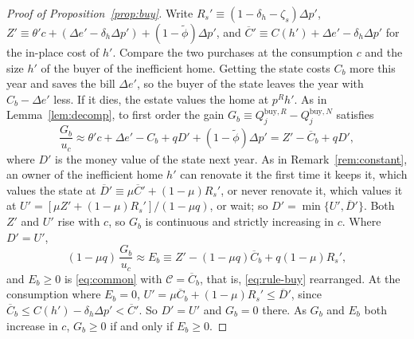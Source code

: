 \begin{proof}[Proof of Proposition~\ref{prop:buy}]
Write $R_s'\equiv(1-\delta_h-\zeta_s)\Delta p'$,
$Z'\equiv\theta'c+(\Delta e'-\delta_h\Delta p')+(1-\tilde\phi)\Delta p'$,
and $\overline C'\equiv C(h')+\Delta e'-\delta_h\Delta p'$ for the in-place
cost of $h'$. Compare the two purchases at the consumption $c$ and the size
$h'$ of the buyer of the inefficient home. Getting the state costs $C_b$
more this year and saves the bill $\Delta e'$, so the buyer of the state
leaves the year with $C_b-\Delta e'$ less. If it dies, the estate values
the home at $p^Rh'$. As in Lemma~\ref{lem:decomp}, to first order the gain
$G_b\equiv Q_j^{\mathrm{buy},R}-Q_j^{\mathrm{buy},N}$ satisfies
\begin{equation*}
  \frac{G_b}{u_c}\approx\theta'c+\Delta e'-C_b+qD'+(1-\tilde\phi)\Delta p'
  =Z'-\overline C_b+qD',
\end{equation*}
where $D'$ is the money value of the state next year. As in
Remark~\ref{rem:constant}, an owner of the inefficient home $h'$ can
renovate it the first time it keeps it, which values the state at
$\overline D'\equiv\mu\overline C'+(1-\mu)R_s'$, or never renovate it, which
values it at $U'=[\mu Z'+(1-\mu)R_s']/(1-\mu q)$, or wait; so
$D'=\min\{U',\overline D'\}$. Both $Z'$ and $U'$ rise with $c$, so $G_b$ is
continuous and strictly increasing in $c$. Where $D'=U'$,
\begin{equation*}
  (1-\mu q)\,\frac{G_b}{u_c}\approx
  E_b\equiv Z'-(1-\mu q)\overline C_b+q(1-\mu)R_s',
\end{equation*}
and $E_b\ge0$ is \eqref{eq:common} with $\mathcal C=\overline C_b$, that
is, \eqref{eq:rule-buy} rearranged. At the consumption where $E_b=0$,
$U'=\mu\overline C_b+(1-\mu)R_s'\le\overline D'$, since
$\overline C_b\le C(h')-\delta_h\Delta p'<\overline C'$. So $D'=U'$ and
$G_b=0$ there. As $G_b$ and $E_b$ both increase in $c$, $G_b\ge0$ if and
only if $E_b\ge0$.
\end{proof}

